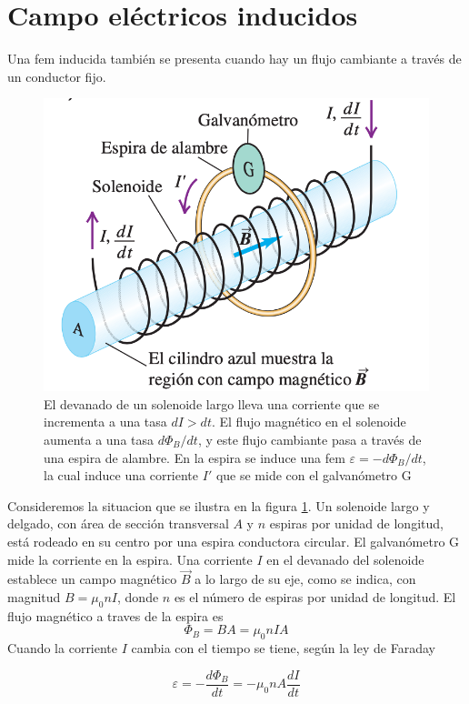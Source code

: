 \section{Campo eléctricos inducidos}
Una fem inducida también se presenta cuando hay un flujo cambiante a través de un conductor fijo.

\begin{figure}[h]\label{fig:galvanometro}
\centering
\includegraphics[scale=0.5]{fig/galvanometro}
\caption{El devanado de un solenoide largo lleva una corriente que se incrementa a una tasa $dI>dt$. El flujo magnético en el solenoide aumenta a una tasa $d\Phi_B/dt$, y este flujo cambiante pasa a través de una espira de alambre. En la espira se induce una fem $\varepsilon= -d\Phi_B/dt$, la cual induce una corriente $I'$ que se mide con el galvanómetro G}
\end{figure}

Consideremos la situacion que se ilustra en la figura \ref{fig:galvanometro}. Un solenoide largo y delgado, con área de sección transversal $A$ y $n$ espiras por unidad de
longitud, está rodeado en su centro por una espira conductora circular. El galvanómetro G mide la corriente en la espira. Una corriente $I$ en el devanado del solenoide establece un campo magnético $\vec{B}$ a lo largo de su eje, como se indica, con magnitud $B=\mu_0nI$, donde $n$ es el número de espiras por unidad de longitud. El flujo magnético a traves de la espira es $$\Phi_B=BA=\mu_0nIA$$ Cuando la corriente $I$ cambia con el tiempo se tiene, según la ley de Faraday

\begin{equation}\label{29.8}
\varepsilon=-\frac{d\Phi_B}{dt}=-\mu_0nA\frac{dI}{dt}
\end{equation}

